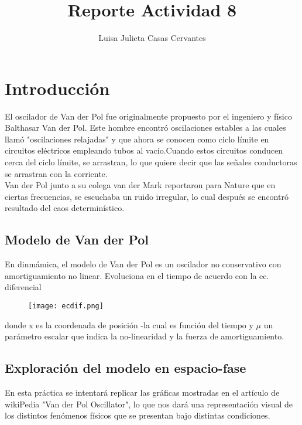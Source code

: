 \documentclass{article}
\title{Reporte Actividad 8}
\author{Luisa Julieta Casas Cervantes}
\begin{document}
\maketitle
\section{Introducción}
El oscilador de Van der Pol fue originalmente propuesto por el ingeniero y físico Balthasar Van der Pol. Este hombre encontró oscilaciones estables a las cuales llamó "oscilaciones relajadas" y que ahora se conocen como ciclo límite en circuitos eléctricos empleando tubos al vacío.Cuando estos circuitos conducen cerca del ciclo límite, se arrastran, lo que quiere decir que las señales conductoras se arrastran con la corriente.
\\Van der Pol junto a su colega van der Mark reportaron para Nature que en ciertas frecuencias, se escuchaba un ruido irregular, lo cual después se encontró resultado del caos determinístico.
\subsection{Modelo de Van der Pol}
En dinmámica, el modelo de Van der Pol es un oscilador no conservativo con amortiguamiento no linear. Evoluciona en el tiempo de acuerdo con la ec. diferencial
\begin{figure}[H]
\texttt{[image: ecdif.png]}
\end{figure}
donde x es la coordenada de posición -la cual es función del tiempo y $\mu$ un parámetro escalar que indica la no-linearidad y la fuerza de amortiguamiento.
\subsection{Exploración del modelo en espacio-fase}
En esta práctica se intentará replicar las gráficas mostradas en el artículo de wikiPedia "Van der Pol Oscillator", lo que nos dará una representación visual de los distintos fenómenos físicos que se presentan bajo distintas condiciones.
\end{document}
